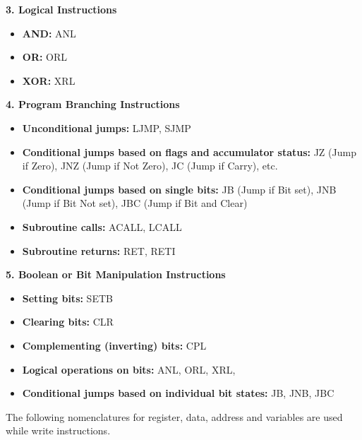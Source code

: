 \documentclass[
]{article}
\begin{document}
\textbf{3. Logical Instructions}

\begin{itemize}
\item
  \textbf{AND:} ANL
\item
  \textbf{OR:} ORL
\item
  \textbf{XOR:} XRL
\end{itemize}

\textbf{4. Program Branching Instructions}

\begin{itemize}
\item
  \textbf{Unconditional jumps:} LJMP, SJMP
\item
  \textbf{Conditional jumps based on flags and accumulator status:} JZ
  (Jump if Zero), JNZ (Jump if Not Zero), JC (Jump if Carry), etc.
\item
  \textbf{Conditional jumps based on single bits:} JB (Jump if Bit set),
  JNB (Jump if Bit Not set), JBC (Jump if Bit and Clear)
\item
  \textbf{Subroutine calls:} ACALL, LCALL
\item
  \textbf{Subroutine returns:} RET, RETI
\end{itemize}

\textbf{5. Boolean or Bit Manipulation Instructions}

\begin{itemize}
\item
  \textbf{Setting bits:} SETB
\item
  \textbf{Clearing bits:} CLR
\item
  \textbf{Complementing (inverting) bits:} CPL
\item
  \textbf{Logical operations on bits:} ANL, ORL, XRL,
\item
  \textbf{Conditional jumps based on individual bit states:} JB, JNB,
  JBC
\end{itemize}

The following nomenclatures for register, data, address and variables
are used while write instructions.
\end{document}
